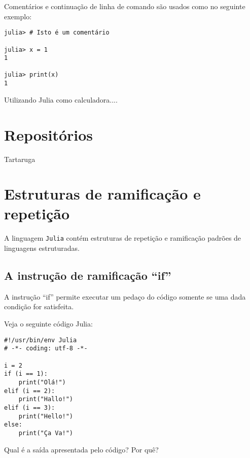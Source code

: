 Comentários e continuação de linha de comando são usados como no seguinte exemplo:

\begin{lstlisting}
julia> # Isto é um comentário

julia> x = 1
1

julia> print(x)
1
\end{lstlisting}





Utilizando Julia como calculadora....




































\section{Repositórios}

Tartaruga 






\section{Estruturas de ramificação e repetição}

A linguagem \verb+Julia+ contém estruturas de repetição e ramificação padrões de linguagens estruturadas.

\subsection{A instrução de ramificação ``if''}

A instrução ``if'' permite executar um pedaço do código somente se uma dada condição for satisfeita.

\begin{ex}
  Veja o seguinte código Julia:
\begin{lstlisting}
#!/usr/bin/env Julia
# -*- coding: utf-8 -*-

i = 2
if (i == 1):
    print("Olá!")
elif (i == 2):
    print("Hallo!")
elif (i == 3):
    print("Hello!")
else:
    print("Ça Va!")
\end{lstlisting}
Qual é a saída apresentada pelo código? Por quê?
\end{ex}

